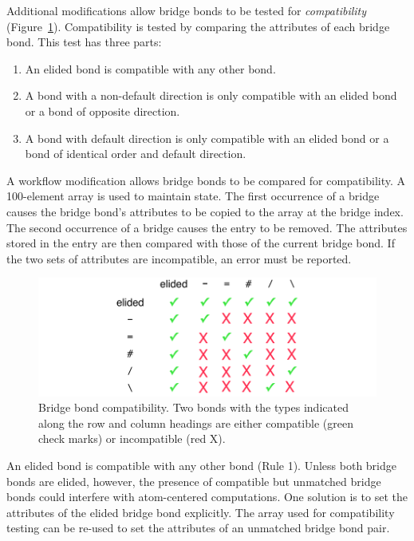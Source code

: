 \documentclass{article}
\begin{document}
Additional modifications allow bridge bonds to be tested for \textit{compatibility} (Figure~\ref{fig:bridge-bond-compatibility}). Compatibility is tested by comparing the attributes of each bridge bond. This test has three parts:

\begin{enumerate}
    \item An elided bond is compatible with any other bond.
    \item A bond with a non-default direction is only compatible with an elided bond or a bond of opposite direction.
    \item A bond with default direction is only compatible with an elided bond or a bond of identical order and default direction.
\end{enumerate}

A workflow modification allows bridge bonds to be compared for compatibility. A 100-element array is used to maintain state. The first occurrence of a bridge causes the bridge bond's attributes to be copied to the array at the bridge index. The second occurrence of a bridge causes the entry to be removed. The attributes stored in the entry are then compared with those of the current bridge bond. If the two sets of attributes are incompatible, an error must be reported.

\begin{figure}
    \centering
    \includegraphics[width=\columnwidth]{brdige-bond-compatibility.pdf}
    \caption{Bridge bond compatibility. Two bonds with the types indicated along the row and column headings are either compatible (green check marks) or incompatible (red X).}
    \label{fig:bridge-bond-compatibility}
\end{figure}

An elided bond is compatible with any other bond (Rule 1). Unless both bridge bonds are elided, however, the presence of compatible but unmatched bridge bonds could interfere with atom-centered computations. One solution is to set the attributes of the elided bridge bond explicitly. The array used for compatibility testing can be re-used to set the attributes of an unmatched bridge bond pair.
\end{document}
